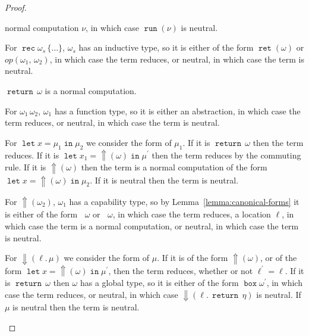 \documentclass[acmsmall, screen, review, anonymous]{acmart}
\theoremstyle{definition}
\newcommand{\reflectname}{\mathord{\Uparrow}}
\newcommand{\performraw}[2]{\mathop{\reflectname(#1(#2))}}
\newcommand{\perform}[3]{\performraw{#1}{#2}(#3)}
\newcommand{\reifyname}{\Downarrow}
\newcommand{\reify}[2]{\mathop{\reifyname}(#1.\,#2)}
\newcommand{\loc}{\ell}
\newcommand{\outlname}{\mathtt{out}_L}
\newcommand{\outl}[1]{\mathop{\outlname} #1}
\newcommand{\outrname}{\mathtt{out}_R}
\newcommand{\outr}[1]{\mathop{\outrname} #1}
\newcommand{\indintro}[3]{{#1}(#2,\, #3)}
\newcommand{\retname}{\mathtt{ret}}
\newcommand{\ret}[1]{\mathop{\retname}(#1)}
\newcommand{\indelimname}{\mathtt{rec}}
\newcommand{\indelim}[2]{\mathop{\indelimname} #1 \,\{#2\}}
\newcommand{\app}[2]{#1\,#2}
\newcommand{\returnname}{\mathop{\mathtt{return}}}
\newcommand{\return}[1]{\returnname\, #1}
\newcommand{\letvname}{\mathop{\mathtt{let}}}
\newcommand{\letv}[3]{\letvname #1 = #2 \mathop{\mathtt{in}} #3}
\newcommand{\gboxname}{\mathop{\mathtt{box}}}
\newcommand{\gbox}[1]{\gboxname #1}
\newcommand{\grunname}{\mathtt{run}}
\newcommand{\grun}[1]{\mathop{\grunname}(#1)}
\begin{document}
\begin{proof}
\begin{description}
    normal computation $\nu$, in which case $\grun{\nu}$ is neutral.
  \item[Recursion] For $\indelim{\omega_s}{\ldots}$, $\omega_s$ has an
    inductive type, so it is either of the form $\ret{\omega}$ or
    $\indintro{op}{\omega_1}{\omega_2}$, in which case the term
    reduces, or neutral, in which case the term is neutral.
  \item[Return] $\return{\omega}$ is a normal computation.
  \item[Application] For $\app{\omega_1}{\omega_2}$, $\omega_1$ has a
    function type, so it is either an abstraction, in which case the
    term reduces, or neutral, in which case the term is neutral.
  \item[Let] For $\letv{x}{\mu_1}{\mu_2}$ we consider the form of
    $\mu_1$. If it is $\return{\omega}$ then the term reduces. If it is
    $\letv{x_1}{\perform{\loc}{op}{\omega}}{\mu^{\prime}}$ then the
    term reduces by the commuting rule. If it is
    $\perform{\loc}{op}{\omega}$ then the term is a normal computation
    of the form $\letv{x}{\perform{\loc}{op}{\omega}}{\mu_2}$. If it is
    neutral then the term is neutral.
  \item[Reflection] For $\perform{\omega_1}{op}{\omega_2}$, $\omega_1$
    has a capability type, so by Lemma~\ref{lemma:canonical-forms} it
    is either of the form $\outl{\omega}$ or $\outr{\omega}$, in which
    case the term reduces, a location $\loc$, in which case the term is
    a normal computation, or neutral, in which case the term is
    neutral.
  \item[Reification] For $\reify{\loc}{\mu}$ we consider the form of
    $\mu$. If it is of the form $\perform{\loc^{\prime}}{op}{\omega}$,
    or of the form
    $\letv{x}{\perform{\loc^{\prime}}{op}{\omega}}{\mu^{\prime}}$, then
    the term reduces, whether or not $\loc^{\prime} = \loc$. If it is
    $\return{\omega}$ then $\omega$ has a global type, so it is either
    of the form $\gbox{\omega^{\prime}}$, in which case the term
    reduces, or neutral, in which case $\reify{\loc}{\return{\eta}}$ is
    neutral. If $\mu$ is neutral then the term is neutral.
  \end{description}
\end{proof}
\end{document}
